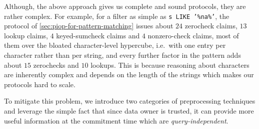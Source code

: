 Although, the above approach gives us complete and sound protocols, they are rather complex. For example, for a filter as simple as \texttt{s LIKE '\%na\%'}, the protocol of \cref{sec:piop-for-pattern-matching} issues about $24$ zerocheck claims, $13$ lookup claims, $4$ keyed-sumcheck claims and $4$ nonzero-check claims, most of them over the bloated character-level hypercube, i.e.\ with one entry per character rather than per string, and every further factor in the pattern adds about $15$ zerochecks and $10$ lookups. This is because reasoning about characters are inherently complex and depends on the length of the strings which makes our protocols hard to scale.

To mitigate this problem, we introduce two categories of preprocessing techniques and leverage the simple fact that since data owner is trusted, it can provide more useful information at the commitment time which are \emph{query-independent}.

